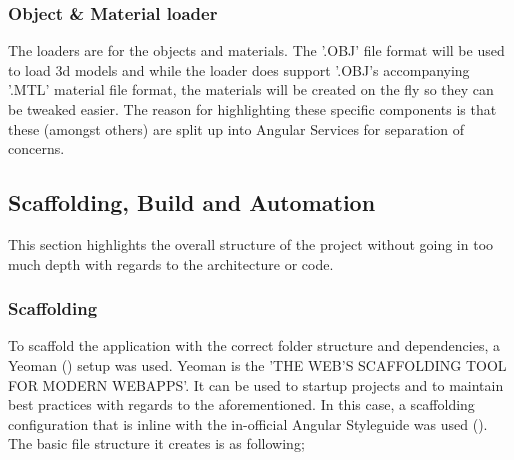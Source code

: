 \subsubsection{Object \& Material loader}
The loaders are for the objects and materials. The '.OBJ' file format will be used to load 3d models and while the loader does support '.OBJ's accompanying '.MTL' material file format, the materials will be created on the fly so they can be tweaked easier.
\newline
The reason for highlighting these specific components is that these (amongst others) are split up into Angular Services for separation of concerns.

\subsection{Scaffolding, Build and Automation}
This section highlights the overall structure of the project without going in too much depth with regards to the architecture or code.
\subsubsection{Scaffolding}
To scaffold the application with the correct folder structure and dependencies, a Yeoman (\cite{yeoman}) setup was used. Yeoman is the 'THE WEB'S SCAFFOLDING TOOL FOR MODERN WEBAPPS'. It can be used to startup projects and to maintain best practices with regards to the aforementioned. In this case, a scaffolding configuration that is inline with the in-official Angular Styleguide was used (\cite{johnPapa}). The basic file structure it creates is as following;

